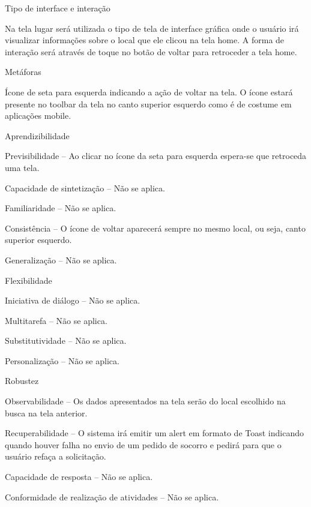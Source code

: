 \begin{alineas}
  \item Tipo de interface e interação
  
Na tela lugar será utilizada o tipo de tela de interface gráfica onde o usuário irá visualizar informações sobre o local que ele clicou na tela home. A forma de interação será através de toque no botão de voltar para retroceder a tela home. 
  \item Metáforas
  
Ícone de seta para esquerda indicando a ação de voltar na tela. O ícone estará presente no toolbar da tela no canto superior esquerdo como é de costume em aplicações mobile.
  \item Aprendizibilidade
  
Previsibilidade – Ao clicar no ícone da seta para esquerda espera-se que retroceda uma tela.

Capacidade de sintetização – Não se aplica.

Familiaridade – Não se aplica.

Consistência – O ícone de voltar aparecerá sempre no mesmo local, ou seja, canto superior esquerdo.

Generalização – Não se aplica.

  \item Flexibilidade
  
Iniciativa de diálogo – Não se aplica.

Multitarefa – Não se aplica.

Substitutividade – Não se aplica.

Personalização – Não se aplica.


  \item Robustez
  
 Observabilidade – Os dados apresentados na tela serão do local escolhido na busca na tela anterior.
 
Recuperabilidade – O sistema irá emitir um alert em formato de Toast indicando quando houver falha no envio de um pedido de socorro e pedirá para que o usuário refaça a solicitação.

Capacidade de resposta – Não se aplica.

Conformidade de realização de atividades – Não se aplica. 
\end{alineas}

